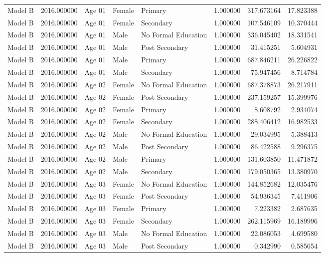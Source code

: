 \begin{table}[ht]
\begin{tabular}{lrlllrrr}
Model B & 2016.000000 & Age 01 & Female & Primary & 1.000000 & 317.673164 & 17.823388 \\
Model B & 2016.000000 & Age 01 & Female & Secondary & 1.000000 & 107.546109 & 10.370444 \\
Model B & 2016.000000 & Age 01 & Male & No Formal Education & 1.000000 & 336.045402 & 18.331541 \\
Model B & 2016.000000 & Age 01 & Male & Post Secondary & 1.000000 & 31.415251 & 5.604931 \\
Model B & 2016.000000 & Age 01 & Male & Primary & 1.000000 & 687.846211 & 26.226822 \\
Model B & 2016.000000 & Age 01 & Male & Secondary & 1.000000 & 75.947456 & 8.714784 \\
Model B & 2016.000000 & Age 02 & Female & No Formal Education & 1.000000 & 687.378873 & 26.217911 \\
Model B & 2016.000000 & Age 02 & Female & Post Secondary & 1.000000 & 237.159257 & 15.399976 \\
Model B & 2016.000000 & Age 02 & Female & Primary & 1.000000 & 8.608792 & 2.934074 \\
Model B & 2016.000000 & Age 02 & Female & Secondary & 1.000000 & 288.406412 & 16.982533 \\
Model B & 2016.000000 & Age 02 & Male & No Formal Education & 1.000000 & 29.034995 & 5.388413 \\
Model B & 2016.000000 & Age 02 & Male & Post Secondary & 1.000000 & 86.422588 & 9.296375 \\
Model B & 2016.000000 & Age 02 & Male & Primary & 1.000000 & 131.603850 & 11.471872 \\
Model B & 2016.000000 & Age 02 & Male & Secondary & 1.000000 & 179.050365 & 13.380970 \\
Model B & 2016.000000 & Age 03 & Female & No Formal Education & 1.000000 & 144.852682 & 12.035476 \\
Model B & 2016.000000 & Age 03 & Female & Post Secondary & 1.000000 & 54.936345 & 7.411906 \\
Model B & 2016.000000 & Age 03 & Female & Primary & 1.000000 & 7.223382 & 2.687635 \\
Model B & 2016.000000 & Age 03 & Female & Secondary & 1.000000 & 262.115969 & 16.189996 \\
Model B & 2016.000000 & Age 03 & Male & No Formal Education & 1.000000 & 22.086053 & 4.699580 \\
Model B & 2016.000000 & Age 03 & Male & Post Secondary & 1.000000 & 0.342990 & 0.585654 \\

\end{tabular}
\end{table}
